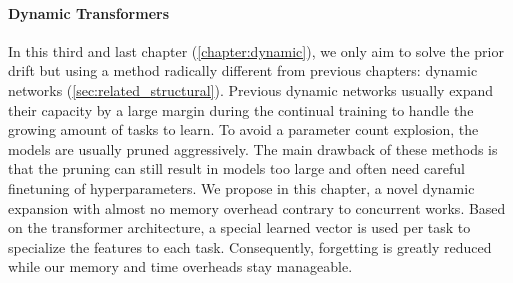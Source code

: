 \paragraph{Dynamic Transformers} In this third and last chapter (\autoref{chapter:dynamic}), we only
aim to solve the prior drift but using a method radically different from previous chapters: dynamic
networks (\autoref{sec:related_structural}). Previous dynamic networks usually expand their
capacity by a large margin during the continual training to handle the growing amount of tasks to
learn. To avoid a parameter count explosion, the models are usually pruned aggressively. The main
drawback of these methods is that the pruning can still result in models too large and often need
careful finetuning of hyperparameters. We propose in this chapter, a novel dynamic expansion with
almost no memory overhead contrary to concurrent works. Based on the transformer architecture, a
special learned vector is used per task to specialize the features to each task. Consequently,
forgetting is greatly reduced while our memory and time overheads stay manageable.
